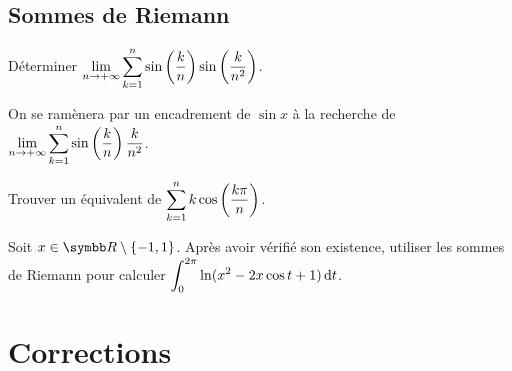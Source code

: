 \subsection{Sommes de Riemann}

\begin{exercice}
    Déterminer $\displaystyle\lim_{n\rightarrow+\infty}\sum_{k=1}^{n}\sin\left(\frac{k}{n}\right)\sin\left(\frac{k}{n^{2}}\right)$.

    On se ramènera par un encadrement de $\sin x$ à la recherche de $\displaystyle \lim_{n\rightarrow+\infty}\sum_{k=1}^{n}\sin\left(\frac{k}{n}\right)\frac{k}{n^{2}}$.
\end{exercice}

\begin{exercice}
    Trouver un équivalent de $\displaystyle \sum_{k=1}^{n}k \cos\left(\frac{k\pi}{n}\right)$.
\end{exercice}

\begin{exercice}
    Soit $x \in \R \setminus \{-1,1\}$.
    Après avoir vérifié son existence, utiliser les sommes de Riemann pour calculer $\displaystyle \int_{0}^{2\pi}\ln(x^{2}-2x \cos t + 1)\,\mathrm{d}t$.
\end{exercice}

\newpage
\section{Corrections}

